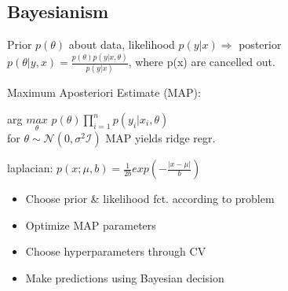 \subsection{Bayesianism}

Prior $p(\theta)$ about data, likelihood $p(y|x) \Rightarrow$ posterior $p(\theta|y,x) = \frac{p(\theta) p(y|x,\theta)}{p(y|x)}$, where p(x) are cancelled out.

Maximum Aposteriori Estimate (MAP):
\begin{center}
    arg $\underset{\theta}{max}$ $p(\theta)\prod_{i=1}^n p(y_i|x_i,\theta)$
    \\ for $\theta \sim \mathcal{N}(0,\sigma^2\mathcal{I})$ MAP yields ridge regr.
\end{center}


laplacian: $p(x;\mu,b) = \frac{1}{2b}exp(-\frac{|x-\mu|}{b})$
\begin{itemize}
    \item Choose prior \& likelihood fct. according to problem
    \item Optimize MAP parameters
    \item Choose hyperparameters through CV
    \item Make predictions using Bayesian decision
\end{itemize}

